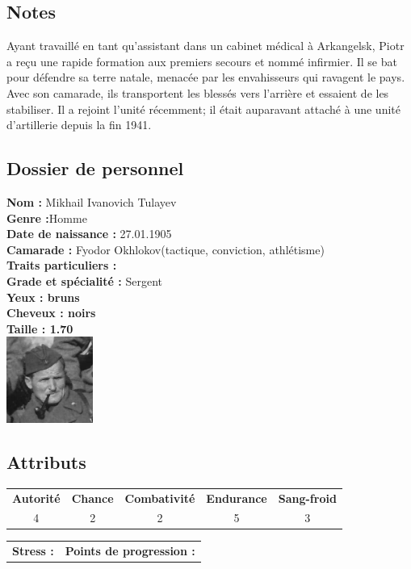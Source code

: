 \documentclass{report}
\begin{document}
\subsection*{Notes}
Ayant travaillé en tant qu'assistant dans un cabinet médical à Arkangelsk, Piotr a reçu une rapide formation aux premiers secours et nommé infirmier. Il se bat pour défendre sa terre natale, menacée par les envahisseurs qui ravagent le pays. Avec son camarade, ils transportent les blessés vers l'arrière et essaient de les stabiliser. Il a rejoint l'unité récemment; il était auparavant attaché à une unité d'artillerie depuis la fin 1941.
\newpage
\ttfamily
\begin{center}
\section*{Dossier de personnel}
\begin{multicols}{3}
\textbf{Nom :} Mikhail Ivanovich Tulayev\\
\textbf{Genre :}Homme\\
\textbf{Date de naissance :} 27.01.1905\\
\textbf{Camarade :} Fyodor Okhlokov(tactique, conviction, athlétisme)\\
\textbf{Traits particuliers :}\\
\columnbreak
\textbf{Grade et spécialité :} Sergent\\
\textbf{Yeux : bruns}\\
\textbf{Cheveux : noirs}\\
\textbf{Taille : 1.70}\\
\columnbreak
\includegraphics[height=80pt]{mikhail.jpg}
\end{multicols}
\end{center}
\noindent\makebox[\linewidth]{\rule{\textwidth}{0.4pt}}
\subsection*{Attributs}
\begin{center}
    \begin{tabular}{c|c|c|c|c}
        \textbf{Autorité} & \textbf{Chance} & \textbf{Combativité} & \textbf{Endurance} & \textbf{Sang-froid} \\
         4&2 &2 &5 &3\\

    \end{tabular}
\end{center}
\begin{tabular}{m{} m{}}
     \textbf{Stress :} & \textbf{Points de progression :}
\end{tabular}\\
\noindent\makebox[\linewidth]{\rule{\textwidth}{0.4pt}}
\end{document}
